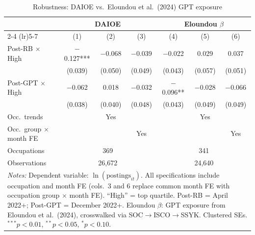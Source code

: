 \begin{table}[htbp]
\centering
\caption{Robustness: DAIOE vs.\ Eloundou et al.\ (2024) GPT exposure}
\label{tab:eloundou_robust}
\footnotesize
\setlength{\tabcolsep}{3pt}
\begin{tabular}{lcccccc}
\hline\hline
 & \multicolumn{3}{c}{DAIOE} & \multicolumn{3}{c}{Eloundou $\beta$} \\
\cmidrule(lr){2-4} \cmidrule(lr){5-7}
  & (1) & (2) & (3) & (4) & (5) & (6) \\
\hline
Post-RB $\times$ High & $-$0.127*** & $-$0.068 & $-$0.039 & $-$0.022 & 0.029 & 0.037 \\
 & (0.039) & (0.050) & (0.049) & (0.043) & (0.057) & (0.051) \\[3pt]
Post-GPT $\times$ High & $-$0.062 & 0.018 & $-$0.032 & $-$0.096** & $-$0.028 & $-$0.066 \\
 & (0.038) & (0.040) & (0.048) & (0.043) & (0.049) & (0.049) \\
\hline
Occ.\ trends & & Yes & & & Yes & \\
Occ.\ group $\times$ month FE & & & Yes & & & Yes \\
Occupations & \multicolumn{3}{c}{369} & \multicolumn{3}{c}{341} \\
Observations & \multicolumn{3}{c}{26,672} & \multicolumn{3}{c}{24,640} \\
\hline\hline
\multicolumn{7}{p{0.93\textwidth}}{\scriptsize \textit{Notes:} Dependent variable: $\ln(\text{postings}_{it})$. All specifications include occupation and month FE (cols.\ 3 and 6 replace common month FE with occupation group $\times$ month FE). ``High'' = top quartile. Post-RB = April 2022+; Post-GPT = December 2022+. Eloundou $\beta$: GPT exposure from Eloundou et al.\ (2024), crosswalked via SOC$\to$ISCO$\to$SSYK. Clustered SEs. $^{***}p<0.01$, $^{**}p<0.05$, $^{*}p<0.10$.} \\
\end{tabular}
\end{table}
